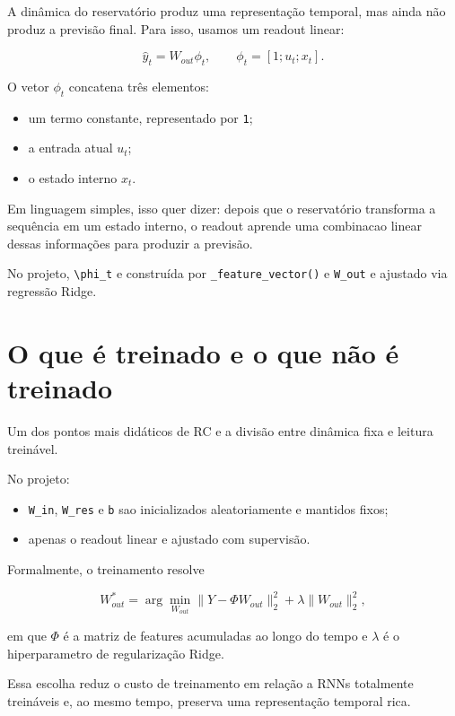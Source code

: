 \documentclass[12pt]{article}
\providecommand{\tightlist}{%
              \setlength{\itemsep}{0pt}\setlength{\parskip}{0pt}}
\begin{document}
A dinâmica do reservatório produz uma representação temporal, mas ainda não produz a previsão final. Para isso, usamos um readout linear:

\[
\hat{y}_t = W_{out} \phi_t,
\qquad
\phi_t = [1; u_t; x_t].
\]

O vetor \(\phi_t\) concatena três elementos:

\begin{itemize}
\tightlist
\item
  um termo constante, representado por \texttt{1};
\item
  a entrada atual \(u_t\);
\item
  o estado interno \(x_t\).
\end{itemize}

Em linguagem simples, isso quer dizer: depois que o reservatório transforma a sequência em um estado interno, o readout aprende uma combinacao linear dessas informações para produzir a previsão.

No projeto, \texttt{\textbackslash{}phi\_t} e construída por \texttt{\_feature\_vector()} e \texttt{W\_out} e ajustado via regressão Ridge.

\section{O que é treinado e o que não é treinado}\label{4-o-que-uxe9-treinado-e-o-que-nuxe3o-uxe9-treinado}

Um dos pontos mais didáticos de RC e a divisão entre dinâmica fixa e leitura treinável.

No projeto:

\begin{itemize}
\tightlist
\item
  \texttt{W\_in}, \texttt{W\_res} e \texttt{b} sao inicializados aleatoriamente e mantidos fixos;
\item
  apenas o readout linear e ajustado com supervisão.
\end{itemize}

Formalmente, o treinamento resolve

\[
W_{out}^* = \arg\min_{W_{out}}
\|Y - \Phi W_{out}\|_2^2 + \lambda \|W_{out}\|_2^2,
\]

em que \(\Phi\) é a matriz de features acumuladas ao longo do tempo e \(\lambda\) é o hiperparametro de regularização Ridge.

Essa escolha reduz o custo de treinamento em relação a RNNs totalmente treináveis e, ao mesmo tempo, preserva uma representação temporal rica.
\end{document}
